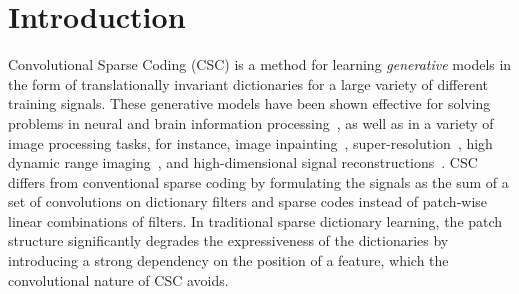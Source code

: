 \section{Introduction}
Convolutional Sparse Coding (CSC) is a method for learning {\em
  generative} models in the form of translationally invariant
dictionaries for a large variety of different training signals.  These
generative models have been shown effective for solving problems in
neural and brain information
processing~\cite{jas2017learning,peter2017sparse}, as well as in a
variety of image processing tasks, for instance, image
inpainting~\cite{heide2015fast},
super-resolution~\cite{gu2015convolutional}, high dynamic range
imaging~\cite{serrano2016convolutional}, and high-dimensional signal
reconstructions~\cite{choudhury2017consensus,bibi2017high}. CSC
differs from conventional sparse coding by formulating the signals as
the sum of a set of convolutions on dictionary filters and sparse
codes instead of patch-wise linear combinations of
filters. In traditional sparse dictionary learning, the patch
structure significantly degrades the expressiveness of the
dictionaries by introducing a strong dependency on the position of a
feature, which the convolutional nature of CSC avoids.



